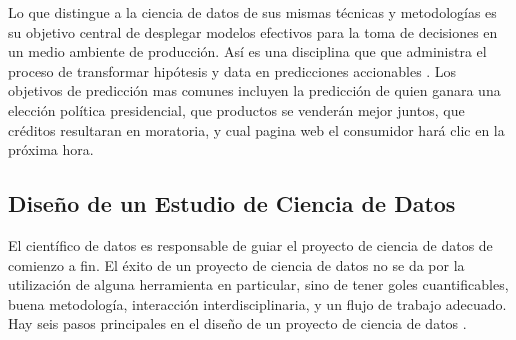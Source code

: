 Lo que distingue a la ciencia de datos de sus mismas técnicas y metodologías es su objetivo central de desplegar modelos efectivos para la toma de decisiones en un medio ambiente de producción. Así es una disciplina que que administra el proceso de transformar hipótesis y data en predicciones accionables \cite{zumelMount}. Los objetivos de predicción mas comunes incluyen la predicción de quien ganara una elección política presidencial, que productos se venderán mejor juntos, que créditos resultaran en moratoria, y cual pagina web el consumidor hará clic en la próxima hora.

\subsection{Diseño de un Estudio de Ciencia de Datos}
El científico de datos es responsable de guiar el proyecto de ciencia de datos de comienzo a fin. El éxito de un proyecto de ciencia de datos no se da por la utilización de alguna herramienta en particular, sino de tener goles cuantificables, buena metodología, interacción interdisciplinaria, y un flujo de trabajo adecuado. Hay seis pasos principales en el diseño de un proyecto de ciencia de datos \cite{zumelMount}.

